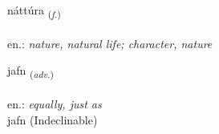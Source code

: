 \documentclass[frontgrid, backgrid]{flacards}\usepackage[]{graphicx}\usepackage[]{xcolor}
\begin{document}
\renewcommand{\blhead}{\vskip5pt {\small\bfseries\footnotesize Nafnorð | Noun }}
\renewcommand{\bcfoot}{\vskip5pt \hspace{2pt}{\small\bfseries\footnotesize 1K}}


{náttúra \small{\textsubscript{(\textit{f.})}} \\[1ex] %
\textphonetic{[nauhtura]} \\
en.: \emph{nature, natural life; character, nature} \\  [2ex]
\renewcommand*{\arraystretch}{0.8}
}


\renewcommand{\flhead}{\vskip5pt \fboxsep=0pt {\small\bfseries\footnotesize Atviksorð | Adverb}}
\renewcommand{\fcfoot}{\vskip5pt \fboxsep=0pt \hspace{2pt}{\small\bfseries\footnotesize 1K}}

\renewcommand{\blhead}{\vskip5pt {\small\bfseries\footnotesize Atviksorð | Adverb }}
\renewcommand{\bcfoot}{\vskip5pt \hspace{2pt}{\small\bfseries\footnotesize 1K}}


{jafn \small{\textsubscript{(\textit{adv.})}} \\[1ex]
\textphonetic{[japn̥]} \\
en.: \emph{equally, just as} \\  [2ex]
jafn (Indeclinable)}


\renewcommand{\flhead}{\vskip5pt \fboxsep=0pt {\small\bfseries\footnotesize Samtenging | Conjuction}}
\renewcommand{\fcfoot}{\vskip5pt \fboxsep=0pt \hspace{2pt}{\small\bfseries\footnotesize 1K}}
\end{document}
